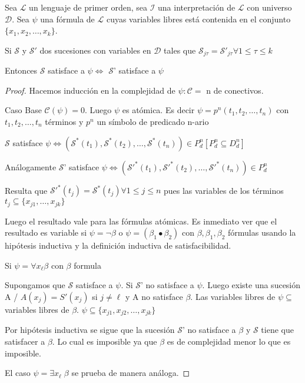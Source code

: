 \begin{proposition}

Sea $\mathcal{L}$ un lenguaje de primer orden, sea $\mathcal{I}$ una interpretaci\'on de $\mathcal{L}$ con universo $\mathcal{D}$. Sea $\psi$ una f\'ormula de $\mathcal{L}$ cuyas variables libres est\'a contenida en el conjunto $\{x_1, x_2, \ldots, x_k\}$.

Si $\mathcal{S}$ y $\mathcal{S}'$ dos sucesiones con variables en $\mathcal{D}$ tales que $\mathcal{S}_{j\tau} = \mathcal{S}'_{j\tau} \forall 1 \leq \tau \leq k$

Entonces $\mathcal{S}$ satisface a $\psi \iff $ $\mathcal{S}$' satisface a $\psi$

\end{proposition}

\begin{proof}

Hacemos inducci\'on en la complejidad de $\psi : \mathcal{C} = $ n de conectivos.

Caso Base $\mathcal{C}(\psi) = 0$. Luego $\psi$ es at\'omica. Es decir $\psi = p^n(t_1, t_2, \ldots, t_n)$ con $t_1, t_2, \ldots, t_n$ t\'erminos y $p^n$ un s\'imbolo de predicado n-ario

$\mathcal{S}$ satisface $\psi \iff \left(\mathcal{S}^*(t_1), \mathcal{S}^*(t_2), \ldots, \mathcal{S}^*(t_n) \right) \in P^{n}_{d} \left[ P^{n}_{d} \subseteq D^{n}_{d} \right]$

An\'alogamente $\mathcal{S}$' satisface $\psi \iff \left(\mathcal{S}'^*(t_1), \mathcal{S}'^*(t_2), \ldots, \mathcal{S}'^*(t_n) \right) \in P^{n}_{d}$

Resulta que $\mathcal{S}'^*(t_j) = \mathcal{S}^*(t_j) \forall 1 \leq j \leq n$ pues las variables de los t\'erminos $t_j \subseteq \{x_{j1}, \ldots, x_{jk}\}$

Luego el resultado vale para las f\'ormulas at\'omicas. Es inmediato ver que el resultado es variable si $\psi = \neg \beta$ o $\psi = (\beta_1 \bullet \beta_2)$ con $\beta, \beta_1, \beta_2$ f\'ormulas usando la hip\'otesis inductiva y la definici\'on inductiva de satisfacibilidad.

Si $\psi = \forall x_{\ell} \beta$ con $\beta$ formula

Supongamos que $\mathcal{S}$ satisface a $\psi$. Si $\mathcal{S}$' no satisface a $\psi$. Luego existe una sucesi\'on A / $A(x_j) = S'(x_j) $ si $j \neq \ell$ y A no satisface $\beta$. Las variables libres de $\psi \subseteq$ variables libres de $\beta$. $\psi \subseteq \{x_{j1}, x_{j2}, \ldots, x_{jk} \}$

Por hip\'otesis inductiva se sigue que la sucesi\'on $\mathcal{S}$' no satisface a $\beta$ y $\mathcal{S}$ tiene que satisfacer a $\beta$. Lo cual es imposible ya que $\beta$ es de complejidad menor lo que es imposible.

El caso $\psi = \exists x_{\ell} \; \beta$ se prueba de manera an\'aloga.

\end{proof}

